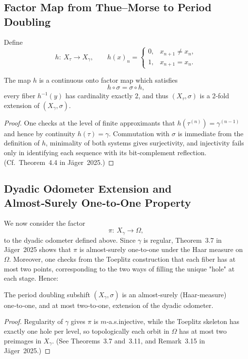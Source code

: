 \subsection{Factor Map from Thue–Morse to Period Doubling}
Define
\[
h:\ X_\tau\to X_\gamma,
\qquad
h(x)_n = \begin{cases}0,&x_{n+1}\neq x_n,\\1,&x_{n+1}=x_n.\end{cases}
\]
\begin{theorem}\label{thm:tm-to-pd}
The map $h$ is a continuous onto factor map which satisfies
\[
h\circ\sigma = \sigma\circ h,
\]
every fiber $h^{-1}(y)$ has cardinality exactly $2$, and thus $(X_\tau,\sigma)$ is a 2‑fold extension of $(X_\gamma,\sigma)$.
\end{theorem}
\begin{proof}
One checks at the level of finite approximants that $h(\tau^{(n)})=\gamma^{(n-1)}$ and hence by continuity $h(\tau)=\gamma$.  Commutation with $\sigma$ is immediate from the definition of $h$, minimality of both systems gives surjectivity, and injectivity fails only in identifying each sequence with its bit‑complement reflection.  (Cf. Theorem 4.4 in Jäger 2025.)
\end{proof}

\subsection{Dyadic Odometer Extension and Almost‑Surely One‑to‑One Property}
We now consider the factor
\[
\pi:\ X_\gamma\to\Omega,
\]
to the dyadic odometer defined above.  Since $\gamma$ is regular, Theorem 3.7 in Jäger 2025 shows that $\pi$ is almost‑surely one‑to‑one under the Haar measure on $\Omega$.  Moreover, one checks from the Toeplitz construction that each fiber has at most two points, corresponding to the two ways of filling the unique "hole" at each stage.  Hence:
\begin{proposition}
The period doubling subshift $(X_\gamma,\sigma)$ is an almost‑surely (Haar‑measure) one‑to‑one, and at most two‑to‑one, extension of the dyadic odometer.
\end{proposition}
\begin{proof}
Regularity of $\gamma$ gives $\pi$ is $m$‑a.s.\;injective, while the Toeplitz skeleton has exactly one hole per level, so topologically each orbit in $\Omega$ has at most two preimages in $X_\gamma$.  (See Theorems 3.7 and 3.11, and Remark 3.15 in Jäger 2025.)
\end{proof}

